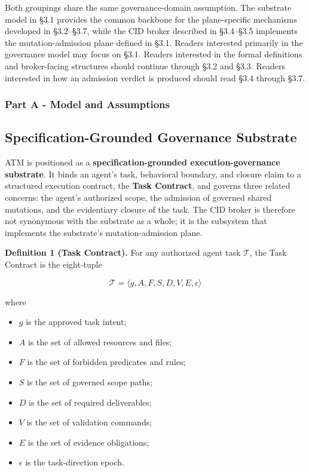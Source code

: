 \documentclass[9pt,letterpaper]{extarticle}
\begin{document}
Both groupings share the same governance-domain assumption. The substrate model in §3.1 provides the common backbone for the plane-specific mechanisms developed in §3.2--§3.7, while the CID broker described in §3.4--§3.5 implements the mutation-admission plane defined in §3.1. Readers interested primarily in the governance model may focus on §3.1. Readers interested in the formal definitions and broker-facing structures should continue through §3.2 and §3.3. Readers interested in how an admission verdict is produced should read §3.4 through §3.7.

\subsubsection*{Part A - Model and Assumptions}

\subsection{Specification-Grounded Governance Substrate}

ATM is positioned as a \textbf{specification-grounded execution-governance substrate}. It binds an agent's task, behavioral boundary, and closure claim to a structured execution contract, the \textbf{Task Contract}, and governs three related concerns: the agent's authorized scope, the admission of governed shared mutations, and the evidentiary closure of the task. The CID broker is therefore not synonymous with the substrate as a whole; it is the subsystem that implements the substrate's mutation-admission plane.

\textbf{Definition 1 (Task Contract).} For any authorized agent task $\mathcal{T}$, the Task Contract is the eight-tuple

\[
\mathcal{T} = \langle g, A, F, S, D, V, E, \epsilon \rangle
\]

where

\begin{itemize}
\item $g$ is the approved task intent;
\item $A$ is the set of allowed resources and files;
\item $F$ is the set of forbidden predicates and rules;
\item $S$ is the set of governed scope paths;
\item $D$ is the set of required deliverables;
\item $V$ is the set of validation commands;
\item $E$ is the set of evidence obligations;
\item $\epsilon$ is the task-direction epoch.
\end{itemize}
\end{document}
